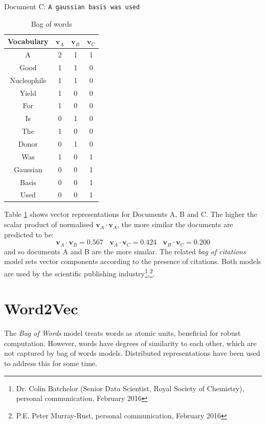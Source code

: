Document C: \texttt{A gaussian basis was used}
\begin{table}[H]
\caption{Bag of words}
\label{tab:BAGOFWORDS}
\begin{center}
\begin{tabular}{||c|c|c|c||}
\hline
Vocabulary &  $\mathbf{v}_A$ & $\mathbf{v}_B$ & $\mathbf{v}_C$\\
\hline
A & 2 & 1 & 1\\
Good & 1 & 1 & 0\\
Nucleophile & 1 & 1 & 0 \\
Yield & 1 & 0 & 0\\
For & 1& 0 & 0\\
Is & 0 & 1 & 0\\
The & 1 & 0 & 0\\
Donor & 0 & 1 & 0\\
Was & 1 & 0 & 1\\
Gaussian & 0 & 0 & 1\\
Basis & 0 & 0 & 1\\
Used & 0 & 0 & 1\\
\hline
\end{tabular}
\end{center}
\end{table}
Table \ref{tab:BAGOFWORDS} shows vector representations for Documents A, B and C. The higher the scalar product of normalised $\mathbf{v}_A \cdot \mathbf{v}_A$, the more similar the documents are predicted to be:
 $$\mathbf{v}_A \cdot \mathbf{v}_B = 0.567 \ \ \ \ \mathbf{v}_A \cdot \mathbf{v}_C = 0.424 \ \ \ \ \mathbf{v}_B \cdot \mathbf{v}_C=0.200$$ 
and so documents A and B are the more similar.
The related \emph{bag of citations} model sets vector components according to the presence of citations. Both models are used by the scientific publishing industry\footnote{Dr. Colin Batchelor  (Senior Data Scientist, Royal Society of Chemistry), personal communication, February 2016},\footnote{P.E. Peter Murray-Rust, personal communication, February 2016}.
\section{Word2Vec}
\label{sec:WORD2VEC}
The \emph{Bag of Words} model treats words as atomic units, beneficial for robust computation. However, words have degrees of similarity to each other, which are not captured by bag of words models\cite{word2veckingqueen}. Distributed representations have been used to address this for some time\cite{distributedrepresentations}.

